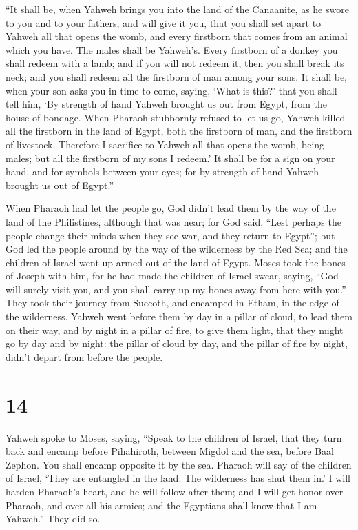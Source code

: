  ``It shall be, when Yahweh brings you into the land of the
Canaanite, as he swore to you and to your fathers, and will give it you,
 that you shall set apart to Yahweh all that opens the
womb, and every firstborn that comes from an animal which you have. The
males shall be Yahweh's.  Every firstborn of a donkey you
shall redeem with a lamb; and if you will not redeem it, then you shall
break its neck; and you shall redeem all the firstborn of man among your
sons.  It shall be, when your son asks you in time to come,
saying, `What is this?' that you shall tell him, `By strength of hand
Yahweh brought us out from Egypt, from the house of bondage.
 When Pharaoh stubbornly refused to let us go, Yahweh
killed all the firstborn in the land of Egypt, both the firstborn of
man, and the firstborn of livestock. Therefore I sacrifice to Yahweh all
that opens the womb, being males; but all the firstborn of my sons I
redeem.'  It shall be for a sign on your hand, and for
symbols between your eyes; for by strength of hand Yahweh brought us out
of Egypt.''

 When Pharaoh had let the people go, God didn't lead them
by the way of the land of the Philistines, although that was near; for
God said, ``Lest perhaps the people change their minds when they see
war, and they return to Egypt'';  but God led the people
around by the way of the wilderness by the Red Sea; and the children of
Israel went up armed out of the land of Egypt.  Moses took
the bones of Joseph with him, for he had made the children of Israel
swear, saying, ``God will surely visit you, and you shall carry up my
bones away from here with you.''  They took their journey
from Succoth, and encamped in Etham, in the edge of the wilderness.
 Yahweh went before them by day in a pillar of cloud, to
lead them on their way, and by night in a pillar of fire, to give them
light, that they might go by day and by night:  the pillar
of cloud by day, and the pillar of fire by night, didn't depart from
before the people.

\hypertarget{section-13}{%
\section{14}\label{section-13}}

 Yahweh spoke to Moses, saying,  ``Speak to the
children of Israel, that they turn back and encamp before Pihahiroth,
between Migdol and the sea, before Baal Zephon. You shall encamp
opposite it by the sea.  Pharaoh will say of the children of
Israel, `They are entangled in the land. The wilderness has shut them
in.'  I will harden Pharaoh's heart, and he will follow
after them; and I will get honor over Pharaoh, and over all his armies;
and the Egyptians shall know that I am Yahweh.'' They did so.

